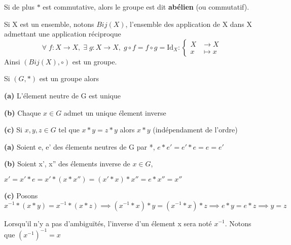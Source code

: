 \documentclass[a4paper, 12pt]{article}
\begin{document}
\begin{remark}
    Si de plus $*$ est commutative, alors le groupe est dit \textbf{abélien} (ou commutatif).
\end{remark}

\begin{example}
    Si X est un ensemble, notons $Bij(X)$, l'ensemble des application de X dans X admettant une application réciproque
    $$
    \forall\; f\!:\!X \rightarrow X,\; \exists\; g\!:\!X \rightarrow X,\; g \circ f = f \circ g = \mathrm{Id}_{X}:
    \begin{cases}
        X\! &\rightarrow X \\
        x\! &\mapsto x
    \end{cases}
    $$
    Ainsi $(Bij(X), \circ)$ est un groupe.
\end{example}

\begin{proposition}
    Si $(G, *)$ est un groupe alors

    \item \textbf{(a)} L'élement neutre de G est unique
    \item \textbf{(b)} Chaque $x \in G$ admet un unique élement inverse
    \item \textbf{(c)} Si $x, y, z \in G$ tel que $x * y = z * y$ alors $x * y$ (indépendament de l'ordre)
\end{proposition}

\begin{demonstration}
    \begin{rdem}
        \textbf{(a)} Soient e, e' des élements neutres de G par *, $e * e' = e' * e = e = e'$
    \end{rdem}
    \begin{rdem}
        \textbf{(b)} Soient x', x'' des élements inverse de $x \in G$,\par $x' = x' * e = x' * (x * x'') = (x' * x) * x'' = e * x'' = x''$
    \end{rdem}
    \begin{rdem}
        \textbf{(c)} Posons $x^{-1} * (x * y) = x^{-1} * (x * z) \implies (x^{-1} * x) * y = (x^{-1} * x) * z \implies e * y = e * z \implies y = z$
    \end{rdem}
\end{demonstration}

\begin{remark}
    Lorsqu'il n'y a pas d'ambiguïtés, l'inverse d'un élement x sera noté $x^{-1}$. Notons que $(x^{-1})^{-1} = x$
\end{remark}
\end{document}
